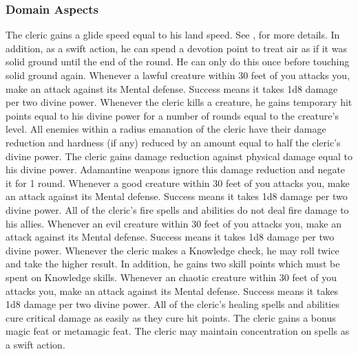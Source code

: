 \subsubsection{Domain Aspects}\label{Domain Aspects}

The cleric gains a glide speed equal to his land speed.
See , for more details.
In addition, as a swift action, he can spend a devotion point to treat air as if it was solid ground until the end of the round.
He can only do this once before touching solid ground again.
Whenever a lawful creature within 30 feet of you attacks you, make an attack against its Mental defense.
Success means it takes 1d8 damage per two divine power.
Whenever the cleric kills a creature, he gains temporary hit points equal to his divine power for a number of rounds equal to the creature's level.
All enemies within a \areamed radius emanation of the cleric have their damage reduction and hardness (if any) reduced by an amount equal to half the cleric's divine power.
The cleric gains damage reduction against physical damage equal to his divine power.
Adamantine weapons ignore this damage reduction and negate it for 1 round.
Whenever a good creature within 30 feet of you attacks you, make an attack against its Mental defense.
Success means it takes 1d8 damage per two divine power.
All of the cleric's fire spells and abilities do not deal fire damage to his allies.
Whenever an evil creature within 30 feet of you attacks you, make an attack against its Mental defense.
Success means it takes 1d8 damage per two divine power.
Whenever the cleric makes a Knowledge check, he may roll twice and take the higher result.
In addition, he gains two skill points which must be spent on Knowledge skills.
Whenever an chaotic creature within 30 feet of you attacks you, make an attack against its Mental defense.
Success means it takes 1d8 damage per two divine power.
All of the cleric's healing spells and abilities cure critical damage as easily as they cure hit points.
The cleric gains a bonus magic feat or metamagic feat.
The cleric may maintain concentration on  spells as a swift action.
